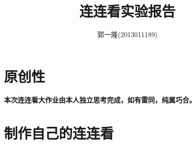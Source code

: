 \documentclass{article}
\author{郭一隆(2013011189)}
\title{连连看实验报告}
\numberwithin{figure}{section}
\numberwithin{table}{section}
\numberwithin{listing}{section}
\numberwithin{equation}{section}
\begin{document}
    \maketitle

    \tableofcontents
    \newpage

    \listoffigures
    \listoftables
    \renewcommand\listoflistingscaption{List of Source Codes}
    \listoflistings
    \newpage

    \section{原创性} %
    \label{sec:原创性}
        
        \textbf{本次连连看大作业由本人独立思考完成，如有雷同，纯属巧合。}


    \section{制作自己的连连看} %
    \label{sec:制作自己的连连看}
    
\end{document}
